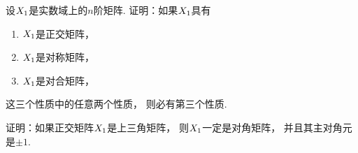 \begin{example}
设\(X_1\)是实数域上的\(n\)阶矩阵.
证明：如果\(X_1\)具有\begin{enumerate}
	\item \(X_1\)是正交矩阵，
	\item \(X_1\)是对称矩阵，
	\item \(X_1\)是对合矩阵，
\end{enumerate}
这三个性质中的任意两个性质，
则必有第三个性质.
\end{example}

\begin{example}
证明：如果正交矩阵\(X_1\)是上三角矩阵，
则\(X_1\)一定是对角矩阵，
并且其主对角元是\(\pm1\).
\end{example}
